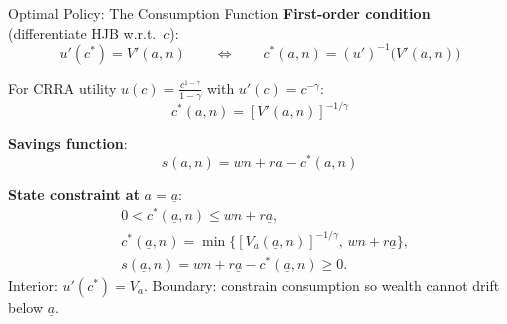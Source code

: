 \documentclass[aspectratio=169,11pt]{beamer}
\newcommand{\ubar}[1]{\underline{#1}}
\begin{document}
\begin{frame}{Optimal Policy: The Consumption Function}
\small
\textbf{First-order condition} (differentiate HJB w.r.t.\ $c$):
\[
u'(c^*) = V'(a,n) \qquad\Longleftrightarrow\qquad \boxed{c^*(a,n) = (u')^{-1}\!\big(V'(a,n)\big)}
\]

For CRRA utility $u(c) = \frac{c^{1-\gamma}}{1-\gamma}$ with $u'(c) = c^{-\gamma}$:
\[
c^*(a,n) = \left[V'(a,n)\right]^{-1/\gamma}
\]

\vspace{0.1em}
\textbf{Savings function}:
\[
s(a,n) = wn + ra - c^*(a,n)
\]

\vspace{0.1em}
\textbf{State constraint at }$a=\ubar{a}$:
\[
\begin{aligned}
&0<c^*(\ubar a,n)\le wn+r\ubar a,\\
&c^*(\ubar a,n)=\min\{[V_a(\ubar a,n)]^{-1/\gamma},\,wn+r\ubar a\},\\
&s(\ubar a,n)=wn+r\ubar a-c^*(\ubar a,n)\ge 0.
\end{aligned}
\]
{\scriptsize Interior: $u'(c^*)=V_a$. Boundary: constrain consumption so wealth cannot drift below $\ubar a$.}
\end{frame}
\end{document}

